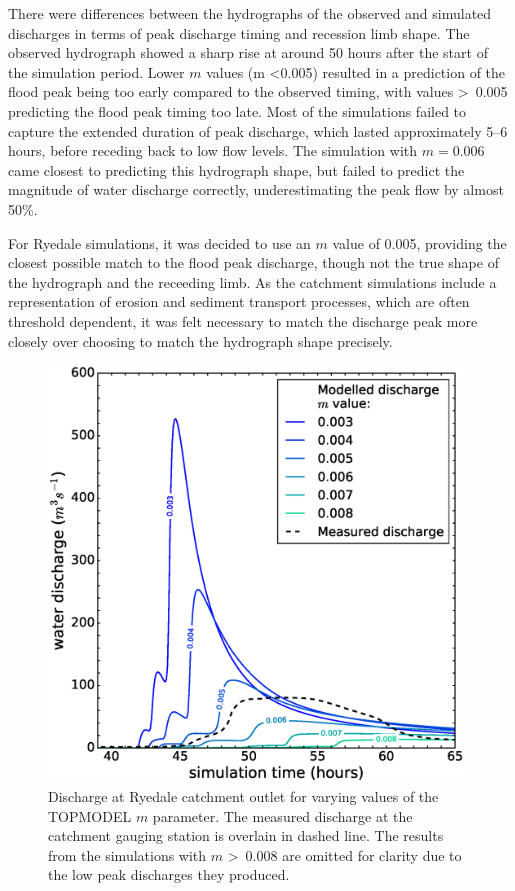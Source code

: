 There were differences between the hydrographs of the observed and simulated discharges in terms of peak discharge timing and recession limb shape. The observed hydrograph showed a sharp rise at around 50 hours after the start of the simulation period. Lower \(m\) values (m \textless 0.005) resulted in a prediction of the flood peak being too early compared to the observed timing, with values \textgreater \ 0.005 predicting the flood peak timing too late. Most of the simulations failed to capture the extended duration of peak discharge, which lasted approximately 5--6 hours, before receding back to low flow levels. The simulation with \(m = 0.006\) came closest to predicting this hydrograph shape, but failed to predict the magnitude of water discharge correctly, underestimating the peak flow by almost 50\%. 

For Ryedale simulations, it was decided to use an \(m\) value of 0.005, providing the closest possible match to the flood peak discharge, though not the true shape of the hydrograph and the receeding limb. As the catchment simulations include a representation of erosion and sediment transport processes, which are often threshold dependent, it was felt necessary to match the discharge peak more closely over choosing to match the hydrograph shape precisely.

\begin{figure}[t]
\includegraphics[width=11cm]{chp06_figures_scripts/figure_ryedale_M_sens.eps}
\caption{Discharge at Ryedale catchment outlet for varying values of the TOPMODEL \(m\) parameter. The measured discharge at the catchment gauging station is overlain in dashed line. The results from the simulations with \(m\) \textgreater \ 0.008 are omitted for clarity due to the low peak discharges they produced.}
\label{fig_topmodel_m_ryedale}
\end{figure}

